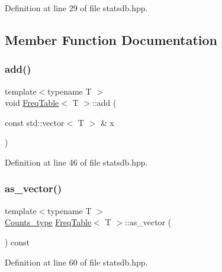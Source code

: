 Definition at line 29 of file statsdb.\+hpp.



\subsection{Member Function Documentation}
\mbox{\label{class_freq_table_a919e08556ba3aa9535a64827315bb89a}} 
\subsubsection{\texorpdfstring{add()}{add()}}
{\footnotesize\ttfamily template$<$typename T $>$ \\
void \hyperlink{class_freq_table}{Freq\+Table}$<$ T $>$\+::add (\begin{DoxyParamCaption}\item[{const std\+::vector$<$ T $>$ \&}]{x }\end{DoxyParamCaption})\hspace{0.3cm}{\ttfamily [inline]}}



Definition at line 46 of file statsdb.\+hpp.

\mbox{\label{class_freq_table_a1898e62605d8753e170189936d403e05}} 
\subsubsection{\texorpdfstring{as\+\_\+vector()}{as\_vector()}}
{\footnotesize\ttfamily template$<$typename T $>$ \\
\hyperlink{typedefs_8hpp_aee40fa17c1fddb63dd1f2b1470ade95b}{Counts\+\_\+type} \hyperlink{class_freq_table}{Freq\+Table}$<$ T $>$\+::as\+\_\+vector (\begin{DoxyParamCaption}{ }\end{DoxyParamCaption}) const\hspace{0.3cm}{\ttfamily [inline]}}



Definition at line 60 of file statsdb.\+hpp.

\mbox{\label{class_freq_table_a326660096e4309780aea8355d0f74ac7}} 
